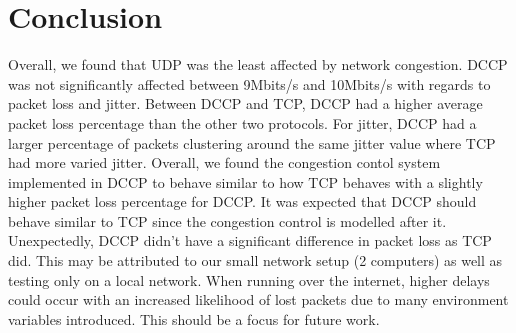 \documentclass[letterpaper, 9 pt, balance, conference]{ieeeconf}
\begin{document}






\section{Conclusion}
\label{sec:concl}

Overall, we found that UDP was the least affected by network congestion.  DCCP was not 
significantly affected between 9Mbits/s and 10Mbits/s with regards to packet loss and 
jitter.  Between DCCP and TCP, DCCP had a higher average packet loss 
percentage than the other two protocols.  For jitter, DCCP had a larger percentage
of packets clustering around the same jitter value where TCP had more varied jitter. 
Overall, 
we found the congestion contol system implemented in DCCP to behave similar to how TCP 
behaves with a slightly higher packet loss percentage for DCCP. It was expected that 
DCCP should behave similar to TCP since the congestion control is modelled after it. 
Unexpectedly, DCCP didn't have a significant difference in packet loss as TCP did. 
This may be attributed to our small network setup (2 computers) as well as testing 
only on a local network.  When running over the internet, higher delays could 
occur with an increased likelihood of lost packets due to many environment variables 
introduced.  This should be a focus for future work.

\balance

\end{document}
